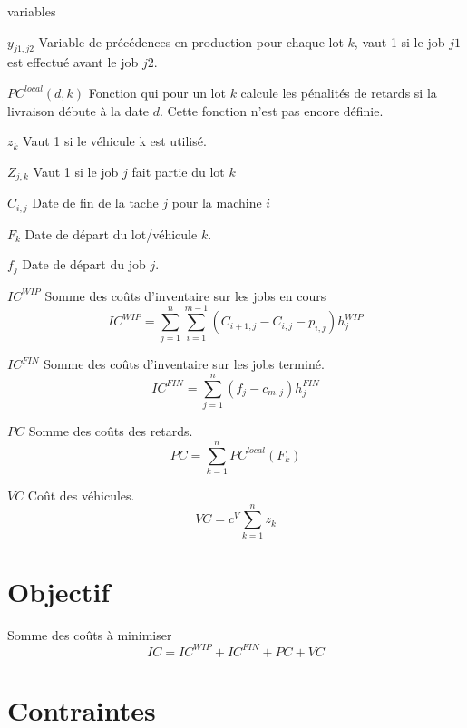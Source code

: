 \documentclass{article}
\begin{document}
        \begin{labeling}{variables}
            \item [$y_{j1,j2}$] Variable de précédences en production pour chaque lot $k$, vaut 1 si le job $j1$ est effectué avant le job $j2$. 
            \item [$PC^{local}\left(d,k\right)$] Fonction qui pour un lot $k$ calcule les pénalités de retards si la livraison débute à la date $d$. Cette fonction n’est pas encore définie.
            \item [$z_k$] Vaut 1 si le véhicule k est utilisé.
            \item [$Z_{j,k}$] Vaut 1 si le job $j$ fait partie du lot $k$
            \item [$C_{i,j}$] Date de fin de la tache $j$ pour la machine $i$
            \item [$F_k$] Date de départ du lot/véhicule $k$.
            \item [$f_j$] Date de départ du job $j$.
            \item [$IC^{WIP}$] Somme des coûts d’inventaire sur les jobs en cours
            $$IC^{WIP}=\sum_{j=1}^{n}\sum_{i=1}^{m-1}{\left(C_{i+1,j}-C_{i,j}-p_{i,j}\right)h_j^{WIP}}$$
            
            \item [$IC^{FIN}$] Somme des coûts d’inventaire sur les jobs terminé.
            $${IC}^{FIN}=\sum_{j=1}^{n}{\left(f_j-c_{m,j}\right)h_j^{FIN}}$$
            \item [$PC$] Somme des coûts des retards.
            $$PC=\sum_{k=1}^{n}{PC^{local}\left(F_k\right)}$$
            \item[$VC$] Coût des véhicules.
            $$VC=c^V\sum_{k=1}^{n}z_k$$
            
        \end{labeling}
    
    
    \section*{Objectif}
        Somme des coûts à minimiser 
        $$IC=IC^{WIP}+IC^{FIN}+PC+VC$$
        
    
    \section*{Contraintes}
    
\end{document}
